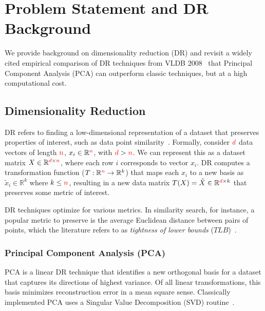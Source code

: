 \section{Problem Statement and DR Background}
\label{sec:background}

We provide background on dimensionality reduction (DR) and revisit a widely cited empirical comparison of DR techniques from VLDB 2008~\cite{keogh-study}  that Principal Component Analysis (PCA) can outperform classic techniques, but at a high computational cost.

\subsection{Dimensionality Reduction}
\label{sec:defs}

DR refers to finding a low-dimensional representation of a dataset that preserves properties of interest, such as data point similarity~\cite{dr-survey1,dr-survey2}.
Formally, consider ${\color{red}d}$ data vectors of length ${\color{red}n}$, $x_i \in \mathbb{R}^{\color{red}n}$, with ${\color{red}d} > {\color{red}n}$. 
We can represent this as a dataset matrix $X \in \mathbb{R}^{{\color{red}d} \times {\color{red}n}}$, where each row $i$ corresponds to vector $x_i$.  
DR computes a transformation function ($T: \mathbb{R}^{\color{red}n} \rightarrow \mathbb{R}^k$) that maps each $x_i$ to a new basis as $\tilde{x}_i \in \mathbb{R}^k$ where $k \leq {\color{red}n}$, resulting in a new data matrix $T(X) = \tilde{X} \in \mathbb{R}^{{\color{red}d} \times k}$ that preserves some metric of interest.  

DR techniques optimize for various metrics. 
In similarity search, for instance, a popular metric to preserve is the average Euclidean distance between pairs of points, which the literature refers to as \emph{tightness of lower bounds} ($TLB$)~\cite{gemini,keogh-study}.


\subsubsection*{Principal Component Analysis (PCA)}
\label{sec:pca}
PCA is a linear DR technique that identifies a new orthogonal basis for a dataset that captures its directions of highest variance.
Of all linear transformations, this basis minimizes reconstruction error in a mean square sense. 
Classically implemented PCA uses a Singular Value Decomposition (SVD) routine~\cite{trefethen}.

